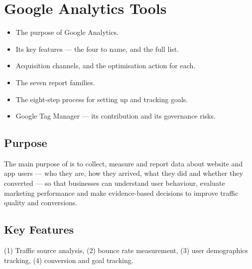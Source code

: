 \documentclass{MMTextbook}
\begin{document}
\chapter{Google Analytics Tools}


\begin{learningoutcomes}
\begin{itemize}
\item The purpose of Google Analytics.
\item Its key features --- the four to name, and the full list.
\item Acquisition channels, and the optimisation action for each.
\item The seven report families.
\item The eight-step process for setting up and tracking goals.
\item Google Tag Manager --- its contribution and its governance risks.
\end{itemize}
\end{learningoutcomes}

\section{Purpose}

\begin{exambox}
The main purpose of  is to collect,
measure and report data about website and app users --- who they are, how they
arrived, what they did and whether they converted --- so that businesses can
understand user behaviour, evaluate marketing performance and make
evidence-based decisions to improve traffic quality and conversions.
\end{exambox}

\section{Key Features}

\begin{exambox}
(1) Traffic source analysis, (2) bounce rate measurement, (3) user demographics
tracking, (4) conversion and goal tracking.
\end{exambox}
\end{document}
